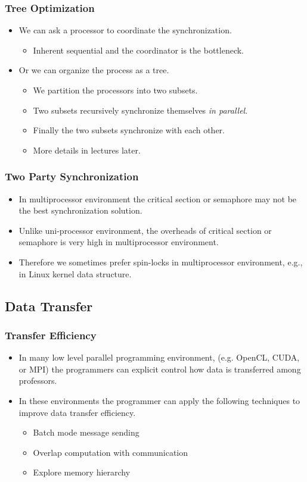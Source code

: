 \documentclass{beamer}
\begin{document}
\begin{CJK}{UTF8}{bsmi}
\begin{frame}
\frametitle{Tree Optimization}
\begin{itemize}
\item We can ask a processor to coordinate the synchronization.
\begin{itemize}
\item Inherent sequential and the coordinator is the bottleneck.
\end{itemize}
\item Or we can organize the process as a tree. 
\begin{itemize}
\item We partition the processors into two subsets.
\item Two subsets recursively synchronize themselves {\em in
  parallel}.
\item Finally the two subsets synchronize with each other.
\item More details in lectures later.
\end{itemize}
\end{itemize}
\end{frame}

\begin{frame}
\frametitle{Two Party Synchronization}
\begin{itemize}
\item In multiprocessor environment the critical section or semaphore
  may not be the best synchronization solution.
\item Unlike uni-processor environment, the overheads of critical
  section or semaphore is very high in multiprocessor environment.
\item Therefore we sometimes prefer spin-locks in multiprocessor
  environment, e.g., in Linux kernel data structure.
\end{itemize}
\end{frame}

\subsection{Data Transfer}

\begin{frame}
\frametitle{Transfer Efficiency}
\begin{itemize}
\item In many low level parallel programming environment,
  (e.g. OpenCL, CUDA, or MPI) the programmers can explicit control
  how data is transferred among professors.
\item In these environments the programmer can apply the following
  techniques to improve data transfer efficiency.
\begin{itemize}
\item Batch mode message sending
\item Overlap computation with communication
\item Explore memory hierarchy 
\end{itemize}
\end{itemize}
\end{frame}


\end{CJK}
\end{document}
